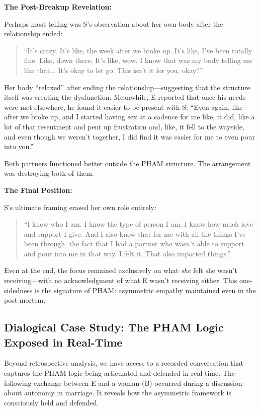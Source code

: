 \documentclass[12pt, letterpaper]{article}
\begin{document}
\textbf{The Post-Breakup Revelation:}

Perhaps most telling was S's observation about her own body after the relationship ended:

\begin{quote}
``It's crazy. It's like, the week after we broke up. It's like, I've been totally fine. Like, down there. It's like, wow. I know that was my body telling me like that... It's okay to let go. This isn't it for you, okay?''
\end{quote}

Her body ``relaxed'' after ending the relationship---suggesting that the structure itself was creating the dysfunction. Meanwhile, E reported that once his needs were met elsewhere, he found it easier to be present with S: ``Even again, like after we broke up, and I started having sex at a cadence for me like, it did, like a lot of that resentment and pent up frustration and, like, it fell to the wayside, and even though we weren't together, I did find it was easier for me to even pour into you.''

Both partners functioned better outside the PHAM structure. The arrangement was destroying both of them.

\textbf{The Final Position:}

S's ultimate framing erased her own role entirely:

\begin{quote}
``I know who I am. I know the type of person I am. I know how much love and support I give. And I also know that for me with all the things I've been through, the fact that I had a partner who wasn't able to support and pour into me in that way, I felt it. That also impacted things.''
\end{quote}

Even at the end, the focus remained exclusively on what \textit{she} felt she wasn't receiving---with no acknowledgment of what E wasn't receiving either. This one-sidedness is the signature of PHAM: asymmetric empathy maintained even in the post-mortem.

\subsection{Dialogical Case Study: The PHAM Logic Exposed in Real-Time}

Beyond retrospective analysis, we have access to a recorded conversation that captures the PHAM logic being articulated and defended in real-time. The following exchange between E and a woman (B) occurred during a discussion about autonomy in marriage. It reveals how the asymmetric framework is consciously held and defended.
\end{document}
